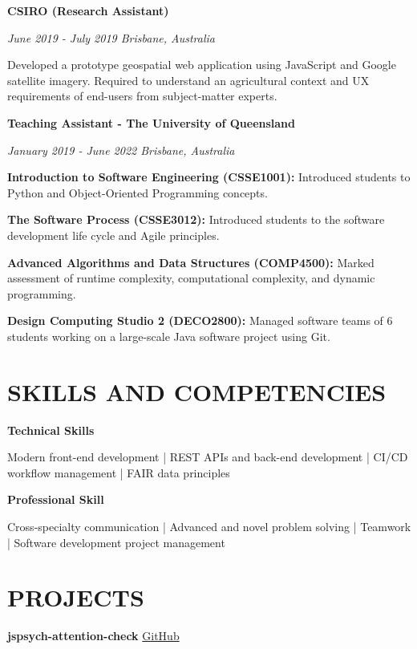 \documentclass{article}
\begin{document}
  {\large\textbf{CSIRO (Research Assistant)}}

  \textit{June 2019 - July 2019 \hfill Brisbane, Australia}

  Developed a prototype geospatial web application using JavaScript and Google satellite imagery. Required to understand an agricultural context and UX requirements of end-users from subject-matter experts.

  \pagebreak

  {\large\textbf{Teaching Assistant - The University of Queensland}}

  \textit{January 2019 - June 2022 \hfill Brisbane, Australia}

  \textbf{Introduction to Software Engineering (CSSE1001):} Introduced students to Python and Object-Oriented Programming concepts.

  \textbf{The Software Process (CSSE3012):} Introduced students to the software development life cycle and Agile principles.

  \textbf{Advanced Algorithms and Data Structures (COMP4500):} Marked assessment of runtime complexity, computational complexity, and dynamic programming.

  \textbf{Design Computing Studio 2 (DECO2800):} Managed software teams of 6 students working on a large-scale Java software project using Git.

  \section*{\centering\uppercase{Skills and Competencies}}

  {\large\textbf{Technical Skills}}

  Modern front-end development | REST APIs and back-end development | CI/CD workflow management | FAIR data principles

  \medbreak

  {\large\textbf{Professional Skill}}

  Cross-specialty communication | Advanced and novel problem solving | Teamwork | Software development project management

  \section*{\centering\uppercase{Projects}}

  \textbf{jspsych-attention-check} \hfill \href{https://github.com/henry-burgess/jspsych-attention-check}{\color{blue}GitHub}
\end{document}
